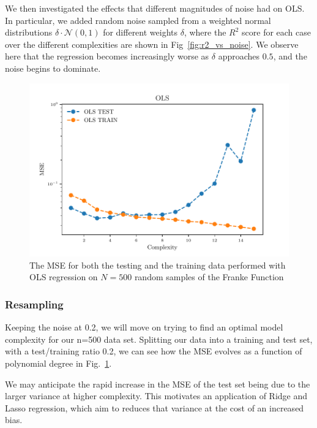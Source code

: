 \documentclass[reprint, english, nofootinbib]{revtex4-2}
\begin{document}
We then investigated the effects that different magnitudes of noise had on OLS. In particular, we added random noise sampled from a weighted normal distributions $\delta \cdot \mathcal N(0, 1)$ for different weights $\delta$, where the $R^2$ score for each case over the different complexities are shown in Fig~\ref{fig:r2_vs_noise}.
We observe here that the regression becomes increasingly worse as $\delta$ approaches $0.5$, and the noise begins to dominate.

\begin{figure}[h!tb]
    \center
    \includegraphics[width=\columnwidth]{../figs/OLS_MSE_Bootstrap_Hastie_211_N_500.pdf}
    \caption{\label{fig:Hastie2.11 MSE Bootstrap}The MSE for both the testing and the training data performed with OLS regression on $N=500$ random samples of the Franke Function}
\end{figure}

\subsubsection{Resampling}

Keeping the noise at 0.2, we will move on trying to find an optimal model complexity for our n=500 data set. Splitting our data into a training and test set, with a test/training ratio 0.2, we can see how the MSE evolves as a function of polynomial degree in Fig.~\ref{fig:Hastie2.11 MSE Bootstrap}.

We may anticipate the rapid increase in the MSE of the test set being due to the larger variance at higher complexity. This motivates an application of Ridge and Lasso regression, which aim to reduces that variance at the cost of an increased bias.
\end{document}
